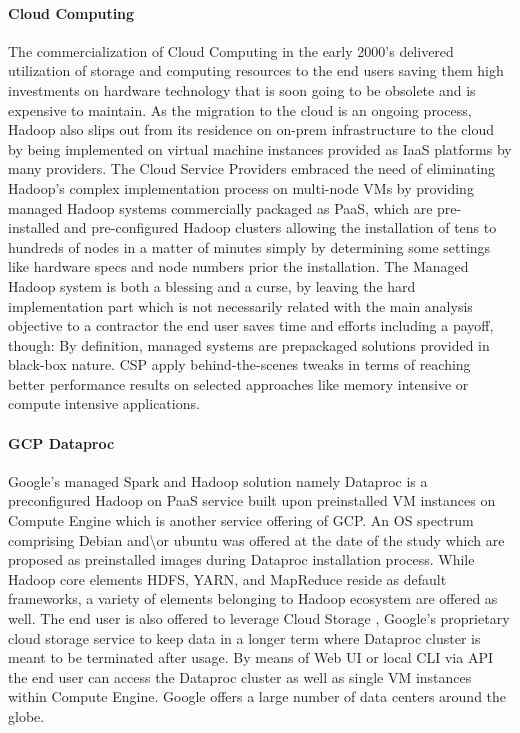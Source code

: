 \documentclass[review]{elsarticle}
\begin{document}
\paragraph{Cloud Computing}The commercialization of Cloud Computing in the early 2000's \cite{noauthor_announcing_nodate} delivered utilization of storage and computing resources to the end users saving them high investments on hardware technology that is soon going to be obsolete and is expensive to maintain. As the migration to the cloud is an ongoing process, Hadoop also slips out from its residence on on-prem infrastructure to the cloud by being implemented on virtual machine instances provided as IaaS platforms by many providers. The Cloud Service Providers embraced the need of eliminating Hadoop's complex implementation process on multi-node VMs by providing managed Hadoop systems commercially packaged as PaaS, which are pre-installed and pre-configured Hadoop clusters allowing the installation of tens to hundreds of nodes in a matter of minutes simply by determining some settings like hardware specs and node numbers prior the installation. The Managed Hadoop system is both a blessing and a curse, by leaving the hard implementation part which is not necessarily related with the main analysis objective to a contractor the end user saves time and efforts including a payoff, though: By definition, managed systems are prepackaged solutions provided in black-box nature. CSP apply behind-the-scenes tweaks in terms of reaching better performance results on selected approaches like memory intensive or compute intensive applications.

\paragraph{GCP Dataproc \cite{noauthor_dataproc_nodate}} Google's managed Spark and Hadoop solution namely Dataproc is a preconfigured Hadoop on PaaS service built upon preinstalled VM instances on Compute Engine \cite{noauthor_compute_nodate} which is another service offering of GCP. An OS spectrum comprising Debian and\textbackslash or ubuntu was offered at the date of the study which are proposed as preinstalled images during Dataproc installation process. While Hadoop core elements HDFS, YARN, and MapReduce reside as default frameworks, a variety of elements belonging to Hadoop ecosystem are offered as well. The end user is also offered to leverage Cloud Storage \cite{noauthor_cloud_nodate}, Google's proprietary cloud storage service to keep data in a longer term where Dataproc cluster is meant to be terminated after usage. By means of Web UI or local CLI via API the end user can access the Dataproc cluster as well as single VM instances within Compute Engine. Google offers a large number of data centers around the globe.
\end{document}
